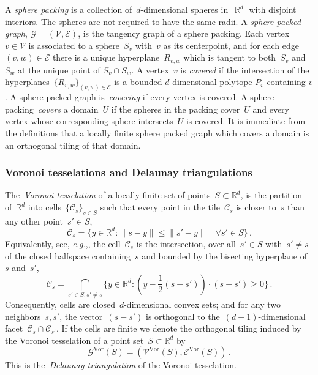 \documentclass[12pt]{amsart}
\numberwithin{equation}{section}
\DeclareMathOperator{\R}{\mathbb{R}}
\newcommand{\eg}{{\it e.g.}}
\newcommand*{\Rd}{\ensuremath{\mathbb{R}^d}}
\newcommand{\G}{\mathcal{G}}
\newcommand{\V}{\mathcal{V}}
\newcommand{\E}{\mathcal{E}}
\newcommand{\GVor}{\mathcal{G}^{\mathrm{Vor}}}
\newcommand{\VVor}{\mathcal{V}^{\mathrm{Vor}}}
\newcommand{\EVor}{\mathcal{E}^{\mathrm{Vor}}}
\begin{document}
A \emph{sphere packing} is a collection of~$d$-dimensional spheres in~$\R^d$ with disjoint interiors. The spheres are not required to have the same radii. A \emph{sphere-packed graph}, $\G = (\V,\E)$, is the tangency graph of a sphere packing. Each vertex~$v \in \V$ is associated to a sphere~$S_v$ with~$v$ as its centerpoint, and for each edge~$(v, w) \in \E$ there is a unique 
hyperplane~$R_{v,w}$ which is tangent to both~$S_v$ and~$S_w$ at the unique point of $S_v\cap S_w$. A vertex~$v$ is \emph{covered} if the intersection of the hyperplanes~$\{R_{v,w}\}_{(v,w) \in \E}$ is a bounded $d$-dimensional polytope $P_v$ containing $v$. A sphere-packed graph is~\emph{covering} if every vertex is covered. A sphere packing~\emph{covers} a domain~$U$ 
if the spheres in the packing cover~$U$ and every vertex whose corresponding sphere intersects~$U$ is covered. 
It is immediate from the definitions that a locally finite sphere packed graph which covers a domain is an orthogonal tiling of that domain. 



\subsubsection{Voronoi tesselations and Delaunay triangulations}

The~\emph{Voronoi tesselation} of a locally finite set of points~$S \subset \Rd$, is the partition of~$\Rd$
into cells~$\{\mathcal{C}_s\}_{s \in S}$ such that every point in the tile~$\mathcal{C}_s$ is closer
to~$s$ than any other point~$s' \in S$, 
\[
\mathcal{C}_s = \{y \in \Rd: \|s - y\| \leq \|s' - y\| \quad \forall s' \in S  \} \, . 
\]
Equivalently, see, \eg ,\cite[Section 1]{mollerLectures}, the cell~$\mathcal{C}_s$ is the intersection, 
over all~$s'\in S$ with~$s' \neq s$ of the closed halfspace 
containing~$s$ and bounded by the bisecting hyperplane of~$s$ and~$s'$, 
\begin{equation}
	\label{eq:half-space-definition-of-cells}
	\mathcal{C}_s = \bigcap_{s' \in S : s' \neq s} \{ y \in \Rd:  (y - \frac{1}{2}(s + s')) \cdot (s-s') \geq 0 \} \, . 
\end{equation}
Consequently, cells are closed~$d$-dimensional convex sets; and for any two neighbors~$s,s'$, the
vector~$(s-s')$ is orthogonal to the~$(d-1)$-dimensional facet~$\mathcal{C}_s \cap \mathcal{C}_{s'}$.
If the cells are finite we denote the orthogonal tiling induced by the Voronoi tesselation of a point set~$S \subset \Rd$ by~
\begin{equation}
	\label{eq:voronoi-tiling-graph}
	\GVor(S) = (\VVor(S), \EVor(S)) \, .
\end{equation}
This is the~\emph{Delaunay triangulation} of the Voronoi tesselation.
\end{document}
